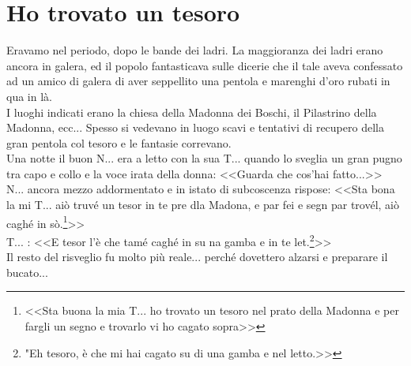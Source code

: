 
\chapter{Ho trovato un tesoro}

Eravamo nel periodo, dopo le bande dei ladri. La maggioranza dei ladri erano ancora in galera, ed il popolo fantasticava sulle dicerie che il tale aveva confessato ad un amico di galera di aver seppellito una pentola e marenghi d'oro rubati in qua in là.\\
\indent I luoghi indicati erano la chiesa della Madonna dei Boschi, il Pilastrino della Madonna, ecc... Spesso si vedevano in luogo scavi e tentativi di recupero della gran pentola col tesoro e le fantasie correvano.\\
\indent Una notte il buon N\:.\:.\:. era a letto con la sua T\:.\:.\:. quando lo sveglia un gran pugno tra capo e collo e la voce irata della donna: <<Guarda che cos'hai fatto...>>\\
\indent {}N\:.\:.\:. ancora mezzo addormentato e in istato di subcoscenza rispose: <<Sta bona la mi T\:.\:.\:. aiò truvé un tesor in te pre dla Madona, e par fei e segn par trovél, aiò caghé in sò.\footnote{<<Sta buona la mia T\:.\:.\:. ho trovato un tesoro nel prato della Madonna e per fargli un segno e trovarlo vi ho cagato sopra>>}>>\\
\indent {}T\:.\:.\:. : <<E tesor l'è che tamé caghé  in su na gamba e in te let.\footnote{"Eh tesoro, è che mi hai cagato su di una gamba e nel letto.>>}>>\\
\indent Il resto del risveglio fu molto più reale... perché dovettero alzarsi e preparare il bucato...


\begin{figure}[hbt]%
	\vspace{-1cm}
    \centering
	\vspace{-0.2cm}
\end{figure}